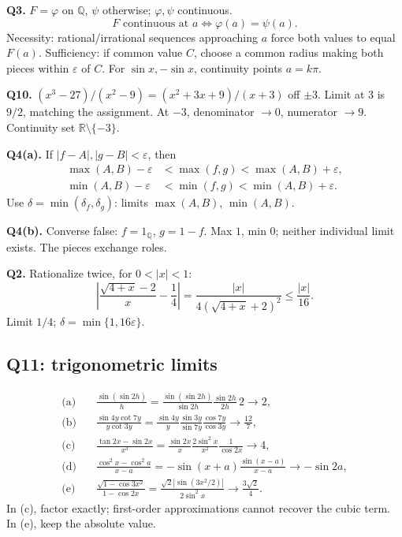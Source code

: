 \documentclass[11pt,letterpaper]{article}
\begin{document}
\textbf{Q3.} \(F=\varphi\) on \(\mathbb Q\), \(\psi\) otherwise;
\(\varphi,\psi\) continuous. \[
F\text{ continuous at }a\iff\varphi(a)=\psi(a).
\] Necessity: rational/irrational sequences approaching \(a\) force both
values to equal \(F(a)\). Sufficiency: if common value \(C\), choose a
common radius making both pieces within \(\varepsilon\) of \(C\). For
\(\sin x,-\sin x\), continuity points \(a=k\pi\).

\textbf{Q10.} \((x^3-27)/(x^2-9)=(x^2+3x+9)/(x+3)\) off \(\pm3\). Limit
at \(3\) is \(9/2\), matching the assignment. At \(-3\), denominator
\(\to0\), numerator \(\to9\). Continuity set
\(\mathbb R\setminus\{-3\}\).

\textbf{Q4(a).} If \(|f-A|,|g-B|<\varepsilon\), then \[
\begin{aligned}
\max(A,B)-\varepsilon&<\max(f,g)<\max(A,B)+\varepsilon,\\
\min(A,B)-\varepsilon&<\min(f,g)<\min(A,B)+\varepsilon.
\end{aligned}
\] Use \(\delta=\min(\delta_f,\delta_g)\): limits \(\max(A,B)\),
\(\min(A,B)\).

\textbf{Q4(b).} Converse false: \(f=1_{\mathbb Q}\), \(g=1-f\). Max
\(1\), min \(0\); neither individual limit exists. The pieces exchange
roles.

\textbf{Q2.} Rationalize twice, for \(0<|x|<1\): \[
\left|\frac{\sqrt{4+x}-2}{x}-\frac14\right|
=\frac{|x|}{4(\sqrt{4+x}+2)^2}\le\frac{|x|}{16}.
\] Limit \(1/4\); \(\delta=\min\{1,16\varepsilon\}\).

\subsection{Q11: trigonometric limits}\label{q11-trigonometric-limits}
\[
\begin{aligned}
\text{(a)}\quad &\frac{\sin(\sin2h)}h
=\frac{\sin(\sin2h)}{\sin2h}\frac{\sin2h}{2h}\,2\to2,\\
\text{(b)}\quad &\frac{\sin4y\cot7y}{y\cot3y}
=\frac{\sin4y}{y}\frac{\sin3y}{\sin7y}\frac{\cos7y}{\cos3y}\to\frac{12}7,\\
\text{(c)}\quad &\frac{\tan2x-\sin2x}{x^3}
=\frac{\sin2x}{x}\frac{2\sin^2x}{x^2}\frac1{\cos2x}\to4,\\
\text{(d)}\quad &\frac{\cos^2x-\cos^2a}{x-a}
=-\sin(x+a)\frac{\sin(x-a)}{x-a}\to-\sin2a,\\
\text{(e)}\quad &\frac{\sqrt{1-\cos3x^2}}{1-\cos2x}
=\frac{\sqrt2|\sin(3x^2/2)|}{2\sin^2x}\to\frac{3\sqrt2}{4}.
\end{aligned}
\] In (c), factor exactly; first-order approximations cannot recover the
cubic term. In (e), keep the absolute value.
\end{document}
